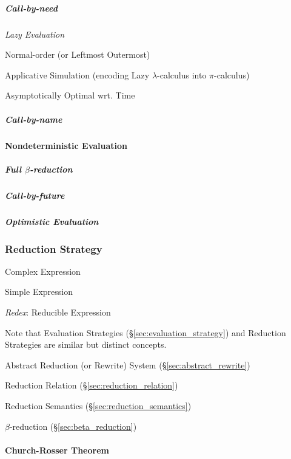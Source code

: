 \subparagraph{Call-by-need}\label{sec:call_by_need}\hfill

\emph{Lazy Evaluation}

Normal-order (or Leftmost Outermost)

Applicative Simulation (encoding Lazy $\lambda$-calculus into
$\pi$-calculus) \cite{milner92}

Asymptotically Optimal wrt. Time %



\subparagraph{Call-by-name}\label{sec:call_by_name}\hfill



\paragraph{Nondeterministic Evaluation}\hfill
\label{sec:nondeterministic_evaluation}



\subparagraph{Full $\beta$-reduction}\label{sec:full_beta_reduction}\hfill

\subparagraph{Call-by-future}\label{sec:call_by_future}\hfill

\subparagraph{Optimistic Evaluation}\label{sec:optimistic_evaluation}\hfill



\subsubsection{Reduction Strategy}\label{sec:reduction_strategy}

Complex Expression

Simple Expression

\emph{Redex}: Reducible Expression

\fist Note that Evaluation Strategies
(\S\ref{sec:evaluation_strategy}) and Reduction Strategies are similar
but distinct concepts.

Abstract Reduction (or Rewrite) System (\S\ref{sec:abstract_rewrite})

Reduction Relation (\S\ref{sec:reduction_relation})

Reduction Semantics (\S\ref{sec:reduction_semantics})

$\beta$-reduction (\S\ref{sec:beta_reduction})



\paragraph{Church-Rosser Theorem}\label{sec:church_rosser}\hfill

